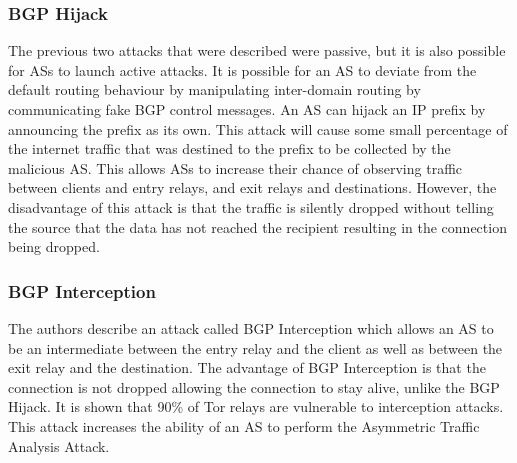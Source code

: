 \documentclass[9pt,technote]{IEEEtran}
\begin{document}
\subsubsection{BGP Hijack}
The previous two attacks that were described were passive, but it is also possible for ASs to launch active attacks. It is possible for an AS to deviate from the default routing behaviour by manipulating inter-domain routing by communicating fake BGP control messages. An AS can hijack an IP prefix by announcing the prefix as its own. This attack will cause some small percentage of the internet traffic that was destined to the prefix to be collected by the malicious AS. This allows ASs to increase their chance of observing traffic between clients and entry relays, and exit relays and destinations. However, the disadvantage of this attack is that the traffic is silently dropped without telling the source that the data has not reached the recipient resulting in the connection being dropped.\\

\subsubsection{BGP Interception}
The authors describe an attack called BGP Interception which allows an AS to be
an intermediate between the entry relay and the client as well as between the
exit relay and the destination. The advantage of BGP Interception is that the
connection is not dropped allowing the connection to stay alive, unlike the BGP
Hijack. It is shown that 90\% of Tor relays are vulnerable to interception
attacks. This attack increases the ability of an AS to perform the Asymmetric
Traffic Analysis Attack.\\ 
\end{document}
